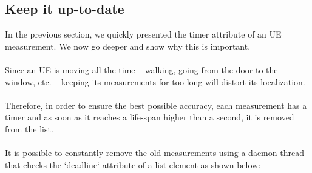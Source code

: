 \subsection{Keep it up-to-date}

In the previous section, we quickly presented the timer attribute of an UE
measurement. We now go deeper and show why this is important.

\paragraph{}
Since an UE is moving all the time -- walking, going from the door to the
window, etc. -- keeping its measurements for too long will distort its
localization.

\paragraph{}
Therefore, in order to ensure the best possible accuracy, each measurement has
a timer and as soon as it reaches a life-span higher than a second, it is
removed from the list.

\paragraph{}
It is possible to constantly remove the old measurements using a daemon thread
that checks the `deadline` attribute of a list element as shown below:

